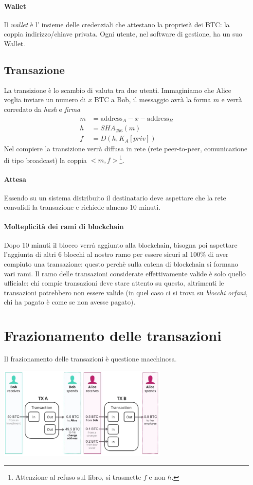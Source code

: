 \paragraph{Wallet} Il \emph{wallet} è l' insieme delle credenziali che attestano la proprietà dei BTC: la coppia indirizzo/chiave privata. Ogni utente, nel software di gestione, ha un suo Wallet.

\subsection{Transazione}
La transizione è lo scambio di valuta tra due utenti. Immaginiamo che Alice voglia inviare un numero di $x$ BTC a Bob, il messaggio avrà la forma $m$ e verrà corredato da \emph{hash} e \emph{firma}
\begin{align*}
	m &= {\text{address}}_A - x - {\text{address}}_B\\
	h &= SHA_{256}(m)\\
	f &= D(h, K_A[priv])
\end{align*}
Nel compiere la transizione verrà diffusa in rete (rete peer-to-peer, comunicazione di tipo broadcast) la coppia $<m, f>$\footnote{Attenzione al refuso sul libro, si trasmette $f$ e non $h$.}.
\paragraph{Attesa} Essendo su un sistema distribuito il destinatario deve aspettare che la rete convalidi la transazione e richiede almeno 10 minuti.
\paragraph{Molteplicità dei rami di blockchain} Dopo 10 minuti il blocco verrà aggiunto alla blockchain, bisogna poi aspettare l'aggiunta di altri 6 blocchi al nostro ramo per essere sicuri al 100\% di aver compiuto una transazione: questo perchè sulla catena di blockchain si formano vari rami. Il ramo delle transazioni considerate effettivamente valide è solo quello ufficiale: chi compie transazioni deve stare attento su questo, altrimenti le transazioni potrebbero non essere valide (in quel caso ci si trova su \emph{blocchi orfani}, chi ha pagato è come se non avesse pagato).

\section{Frazionamento delle transazioni} Il frazionamento delle transazioni è questione macchinosa.
\begin{center}
	\includegraphics[width=320px]{images/31.png}
\end{center}
